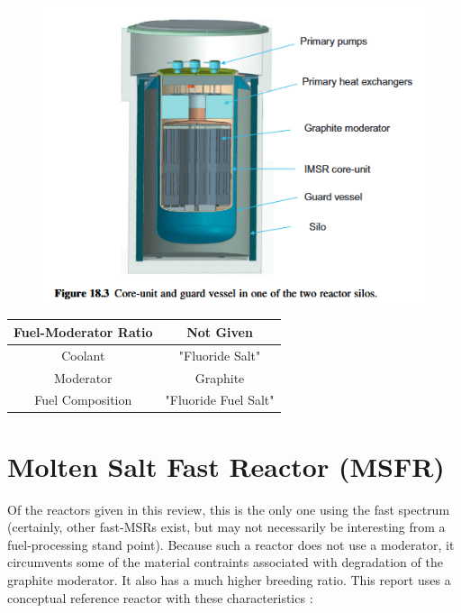 \documentclass[letterpaper]{article}
\begin{document}
\begin{figure}[H]
  \centering
  \includegraphics[width=1.0\linewidth]{figures/IMSRsource2.png}
  \label{fig:fig9}
\end{figure}

\begin{center}
\begin{tabular}{|c|c|}
\hline
Fuel-Moderator Ratio & Not Given \\
\hline
Coolant & "Fluoride Salt" \\
\hline
Moderator & Graphite \\
\hline
Fuel Composition & "Fluoride Fuel Salt" \\
\hline
\end{tabular}
\end{center}

\section{Molten Salt Fast Reactor (MSFR)}
Of the reactors given in this review, this is the only one using the fast spectrum (certainly, other fast-MSRs exist, but may not necessarily be interesting from a fuel-processing stand point).  Because such a reactor does not use a moderator, it circumvents some of the material contraints associated with degradation of the graphite moderator.  It also has a much higher breeding ratio.  This report uses a conceptual reference reactor with these characteristics \cite{rouch_preliminary_2014}: 
\end{document}
